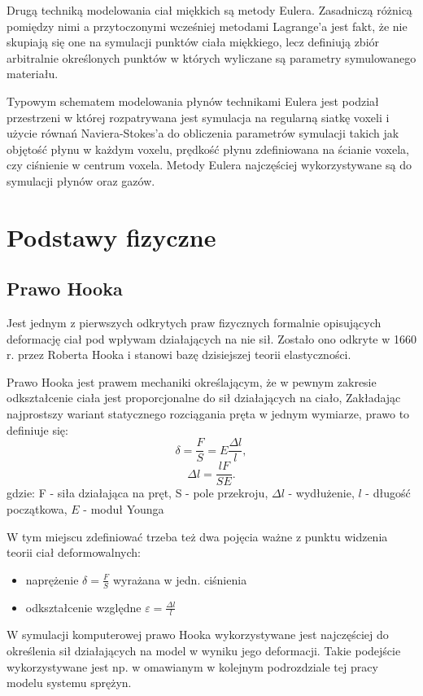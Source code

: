 Drugą techniką modelowania ciał miękkich są metody Eulera. Zasadniczą różnicą
pomiędzy nimi a przytoczonymi wcześniej metodami Lagrange'a jest fakt, że nie skupiają 
się one na symulacji punktów ciała miękkiego, lecz definiują zbiór arbitralnie
określonych punktów w których wyliczane są parametry symulowanego materiału.

Typowym schematem modelowania płynów technikami Eulera jest podział przestrzeni w
której rozpatrywana jest symulacja na regularną siatkę voxeli i użycie równań Naviera-Stokes'a do
obliczenia parametrów symulacji takich jak objętość płynu w każdym voxelu,
 prędkość płynu zdefiniowana na ścianie voxela, czy ciśnienie w centrum voxela.
Metody Eulera najczęściej wykorzystywane są do symulacji płynów oraz gazów.

\section{Podstawy fizyczne}
\subsection{Prawo Hooka}
Jest jednym z pierwszych odkrytych praw fizycznych formalnie opisujących deformację ciał pod wpływam
działających na nie sił. Zostało ono odkryte w 1660 r. przez Roberta Hooka i 
stanowi bazę dzisiejszej teorii elastyczności\cite{elast}.

Prawo Hooka jest prawem mechaniki określającym, że w pewnym zakresie odkształcenie ciała jest
proporcjonalne do sił działających na ciało,
Zakładając najprostszy wariant statycznego rozciągania pręta w jednym wymiarze, prawo to definiuje
się:
$$\delta = \frac{F}{S} = E\frac{\Delta l}{l},$$
$$\Delta l = \frac{lF}{SE}.$$
gdzie:
F - siła działająca na pręt,
S - pole przekroju,
$\Delta l$ - wydłużenie,
$l$ - długość początkowa,
$E$ - moduł Younga

W tym miejscu zdefiniować trzeba też dwa pojęcia ważne z punktu widzenia teorii
ciał deformowalnych:
\begin{itemize}
\item naprężenie $\delta = \frac{F}{S}$ wyrażana w jedn. ciśnienia
\item odkształcenie względne $\varepsilon = \frac{\Delta l}{l}$
\end{itemize}
 
W symulacji komputerowej prawo Hooka wykorzystywane jest najczęściej do określenia sił
działających na model w wyniku jego deformacji. Takie podejście wykorzystywane
jest np. w omawianym w kolejnym podrozdziale tej pracy modelu systemu
sprężyn.

